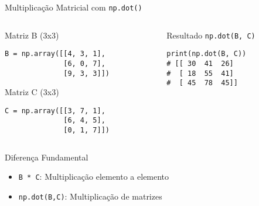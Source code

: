 \begin{frame}[fragile]{Multiplicação Matricial com \texttt{np.dot()}}

\begin{columns}[T]
    \begin{column}{0.4\textwidth}
        \begin{block}{Matriz B (3x3)}
\begin{verbatim}
B = np.array([[4, 3, 1],
              [6, 0, 7],
              [9, 3, 3]])
\end{verbatim}
        \end{block}
        
        \begin{block}{Matriz C (3x3)}
\begin{verbatim}
C = np.array([[3, 7, 1],
              [6, 4, 5],
              [0, 1, 7]])
\end{verbatim}
        \end{block}
    \end{column}
    
    \begin{column}{0.6\textwidth}
        \begin{exampleblock}{Resultado \texttt{np.dot(B, C)}}
\begin{verbatim}
print(np.dot(B, C))
# [[ 30  41  26]
#  [ 18  55  41]
#  [ 45  78  45]]
\end{verbatim}
        \end{exampleblock}
    \end{column}
\end{columns}




\begin{alertblock}{Diferença Fundamental}
\begin{itemize}
    \item \texttt{B * C}: Multiplicação elemento a elemento 
    \item \texttt{np.dot(B,C)}: Multiplicação de matrizes
\end{itemize}
\end{alertblock}
\end{frame}

